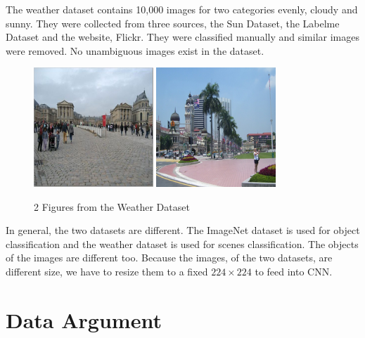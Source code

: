 The weather dataset \citep{lutwo} contains 10,000 images for two categories evenly, cloudy and sunny. They were collected from three sources, the Sun Dataset\citep{russell2008labelme}, the Labelme Dataset\citep{xiao2010sun} and the website, Flickr. They were classified manually and similar images were removed. No unambiguous images exist in the dataset.
\graphicspath{ {./Figures/} }
\begin{figure}[!htb]
    \centering
	\includegraphics[width=0.4\textwidth]{cloudy_0001.png}
    \qquad
    \includegraphics[width=0.4\textwidth]{sunny_0003.png}
    \caption{2 Figures from the Weather Dataset}%
    \label{fig:WeatherExamples}%
\end{figure}

In general, the two datasets are different. The ImageNet dataset is used for object classification and the weather dataset is used for scenes classification. The objects of the images are different too. Because the images, of the two datasets, are different size, we have to resize them to a fixed $224 \times 224$ to feed into CNN.

\section{Data Argument}

